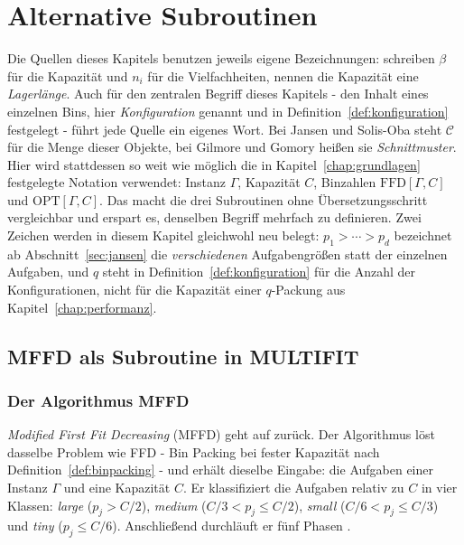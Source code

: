 \chapter{Alternative Subroutinen}
\label{kap:alternative}

Die Quellen dieses Kapitels benutzen jeweils eigene Bezeichnungen: \textcite{jansen_solisoba2010}
schreiben $\beta$ für die Kapazität und $n_i$ für die Vielfachheiten,
\textcite{gilmore_gomory1961} nennen die Kapazität eine \emph{Lagerlänge}.
Auch für den zentralen Begriff dieses Kapitels - den Inhalt eines einzelnen Bins, hier
\emph{Konfiguration} genannt und in Definition~\ref{def:konfiguration} festgelegt - führt jede
Quelle ein eigenes Wort.
Bei Jansen und Solis-Oba steht $\mathcal{C}$ für die Menge dieser Objekte, bei Gilmore und Gomory
heißen sie \emph{Schnittmuster}.
Hier wird stattdessen so weit wie möglich die in Kapitel~\ref{chap:grundlagen} festgelegte Notation
verwendet: Instanz $\Gamma$, Kapazität $C$, Binzahlen $\mathrm{FFD}[\Gamma, C]$ und
$\mathrm{OPT}[\Gamma, C]$.
Das macht die drei Subroutinen ohne Übersetzungsschritt vergleichbar und erspart es, denselben
Begriff mehrfach zu definieren.
Zwei Zeichen werden in diesem Kapitel gleichwohl neu belegt: $p_1 > \cdots > p_d$ bezeichnet ab
Abschnitt~\ref{sec:jansen} die \emph{verschiedenen} Aufgabengrößen statt der einzelnen Aufgaben,
und $q$ steht in Definition~\ref{def:konfiguration} für die Anzahl der Konfigurationen, nicht für
die Kapazität einer $q$-Packung aus Kapitel~\ref{chap:performanz}.

\section{MFFD als Subroutine in MULTIFIT}
\label{sec:mffd-subroutine}

\subsection{Der Algorithmus MFFD}
\label{sub:mffd}

\emph{Modified First Fit Decreasing} (MFFD) geht auf \textcite{johnson_garey1985} zurück.
Der Algorithmus löst dasselbe Problem wie FFD - Bin Packing bei fester Kapazität nach
Definition~\ref{def:binpacking} - und erhält dieselbe Eingabe: die Aufgaben einer Instanz
$\Gamma$ und eine Kapazität $C$.
Er klassifiziert die Aufgaben relativ zu $C$ in vier Klassen:
\emph{large} ($p_j > C/2$), \emph{medium} ($C/3 < p_j \le C/2$), \emph{small} ($C/6 < p_j \le C/3$)
und \emph{tiny} ($p_j \le C/6$).
Anschließend durchläuft er fünf Phasen \cite{johnson_garey1985}.

